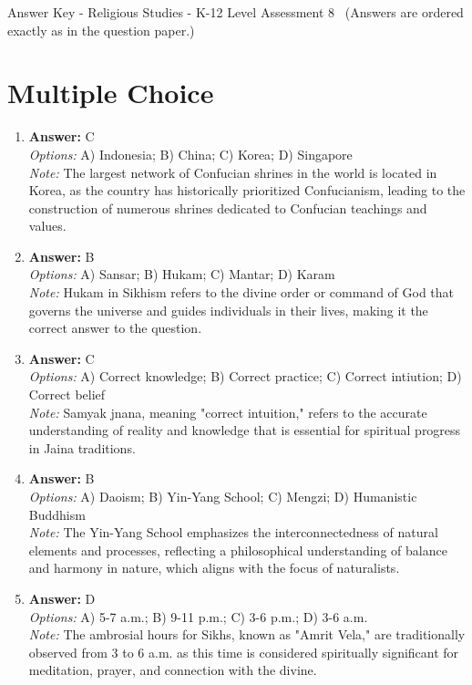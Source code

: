 \documentclass[12pt]{article}
\begin{document}
\begin{center}
Answer Key - Religious Studies - K-12 Level Assessment 8 \
\small (Answers are ordered exactly as in the question paper.)
\end{center}

\section*{Multiple Choice}
\begin{enumerate}[label=\arabic*.]
\item \textbf{Answer:} C
\\ \textit{Options:} A) Indonesia; B) China; C) Korea; D) Singapore
\\ \textit{Note:} The largest network of Confucian shrines in the world is located in Korea, as the country has historically prioritized Confucianism, leading to the construction of numerous shrines dedicated to Confucian teachings and values.
\item \textbf{Answer:} B
\\ \textit{Options:} A) Sansar; B) Hukam; C) Mantar; D) Karam
\\ \textit{Note:} Hukam in Sikhism refers to the divine order or command of God that governs the universe and guides individuals in their lives, making it the correct answer to the question.
\item \textbf{Answer:} C
\\ \textit{Options:} A) Correct knowledge; B) Correct practice; C) Correct intiution; D) Correct belief
\\ \textit{Note:} Samyak jnana, meaning "correct intuition," refers to the accurate understanding of reality and knowledge that is essential for spiritual progress in Jaina traditions.
\item \textbf{Answer:} B
\\ \textit{Options:} A) Daoism; B) Yin-Yang School; C) Mengzi; D) Humanistic Buddhism
\\ \textit{Note:} The Yin-Yang School emphasizes the interconnectedness of natural elements and processes, reflecting a philosophical understanding of balance and harmony in nature, which aligns with the focus of naturalists.
\item \textbf{Answer:} D
\\ \textit{Options:} A) 5-7 a.m.; B) 9-11 p.m.; C) 3-6 p.m.; D) 3-6 a.m.
\\ \textit{Note:} The ambrosial hours for Sikhs, known as "Amrit Vela," are traditionally observed from 3 to 6 a.m. as this time is considered spiritually significant for meditation, prayer, and connection with the divine.
\end{enumerate}
\end{document}
